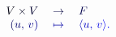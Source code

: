 \documentclass[12pt]{article}
\begin{document}
\makeatletter
\renewcommand*{\@textcolor}[3]{%
  \protect\leavevmode
  \begingroup
    \color#1{#2}#3%
  \endgroup
}
\makeatother
\begin{displaymath}
\begin{array} {rl} { { \mathcolor[RGB]{0,0,15}{V} \mathcolor[RGB]{0,0,30}{\times} \mathcolor[RGB]{0,0,45}{V} } } & { { { } \mathcolor[RGB]{0,0,60}{\to} \quad \mathcolor[RGB]{0,0,75}{F} } } \\ { { \mathcolor[RGB]{0,0,90}{(} \mathcolor[RGB]{0,0,105}{u} \mathcolor[RGB]{0,0,120}{,} \, \mathcolor[RGB]{0,0,135}{v} \mathcolor[RGB]{0,0,150}{)} } } & { { { } \mathcolor[RGB]{0,0,165}{\mapsto} \quad \mathcolor[RGB]{0,0,180}{\langle} \mathcolor[RGB]{0,0,195}{u} \mathcolor[RGB]{0,0,210}{,} \, \mathcolor[RGB]{0,0,225}{v} \mathcolor[RGB]{0,0,240}{\rangle} \mathcolor[RGB]{0,0,255}{.} } } \end{array}
\end{displaymath}
\end{document}

